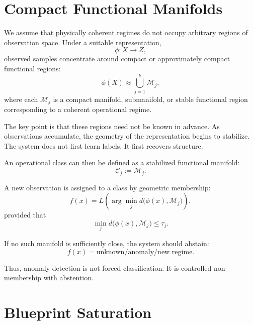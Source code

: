 \documentclass[11pt,a4paper]{article}
\begin{document}
\section{Compact Functional Manifolds}

We assume that physically coherent regimes do not occupy arbitrary regions of observation space. Under a suitable representation,
\begin{equation}
    \phi: X \longrightarrow Z,
\end{equation}
observed samples concentrate around compact or approximately compact functional regions:
\begin{equation}
    \phi(X) \approx \bigcup_{j=1}^{k} \mathcal{M}_j,
\end{equation}
where each $\mathcal{M}_j$ is a compact manifold, submanifold, or stable functional region corresponding to a coherent operational regime.

The key point is that these regions need not be known in advance. As observations accumulate, the geometry of the representation begins to stabilize. The system does not first learn labels. It first recovers structure.

An operational class can then be defined as a stabilized functional manifold:
\begin{equation}
    \mathcal{C}_j := \mathcal{M}_j.
\end{equation}

A new observation is assigned to a class by geometric membership:
\begin{equation}
    f(x) =
    L\left(
    \arg\min_j d\bigl(\phi(x),\mathcal{M}_j\bigr)
    \right),
\end{equation}
provided that
\begin{equation}
    \min_j d\bigl(\phi(x),\mathcal{M}_j\bigr) \leq \tau_j.
\end{equation}

If no such manifold is sufficiently close, the system should abstain:
\begin{equation}
    f(x) = \text{unknown/anomaly/new regime}.
\end{equation}

Thus, anomaly detection is not forced classification. It is controlled non-membership with abstention.

\section{Blueprint Saturation}
\end{document}
